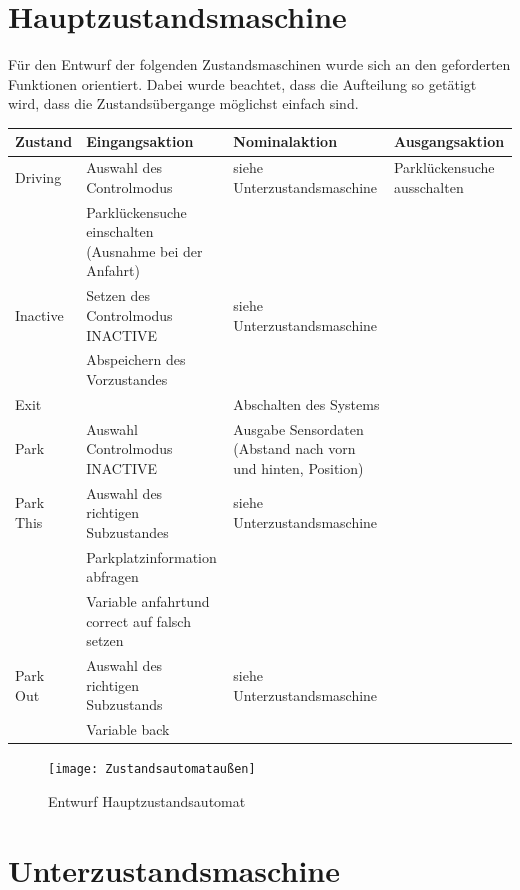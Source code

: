 \section{Hauptzustandsmaschine}

Für den Entwurf der folgenden Zustandsmaschinen wurde sich an den geforderten Funktionen orientiert. Dabei wurde beachtet, dass die Aufteilung so getätigt wird, dass die Zustandsübergange möglichst einfach sind.\\

\noindent \begin{tabular}{|p{1.5cm}|p{4cm}|p{3.8cm}|p{3cm}|}
	\hline 
	Zustand & Eingangsaktion & Nominalaktion & Ausgangsaktion \\ 
	\hline 
	Driving & Auswahl des Controlmodus & siehe Unterzustandsmaschine & Parklückensuche ausschalten \\ 
	\hline 
	 & Parklückensuche einschalten (Ausnahme bei der Anfahrt) &  &  \\ 
	\hline
	Inactive & Setzen des Controlmodus \glqq INACTIVE\grqq{} & siehe Unterzustandsmaschine &  \\ 
	\hline 
	& Abspeichern des Vorzustandes & &  \\ 
	\hline 
	Exit &  & Abschalten des Systems &  \\ 
	\hline
	Park & Auswahl Controlmodus \glqq INACTIVE\grqq & Ausgabe Sensordaten (Abstand nach vorn und hinten, Position) &  \\ 
	\hline
	Park This & Auswahl des richtigen Subzustandes & siehe Unterzustandsmaschine &  \\ 
	\hline
	 & Parkplatzinformation abfragen &  &  \\ 
	\hline
	 & Variable \glqq anfahrt\grqq und \glqq correct\grqq{} auf falsch setzen &  &  \\
	\hline
	Park Out & Auswahl des richtigen Subzustands & siehe Unterzustandsmaschine &  \\ 
	\hline 
	 & 	Variable \glqq back\grqq & & \\
	\hline
\end{tabular} 

\begin{figure}[h]
	\centering
	\texttt{[image: Zustandsautomataußen]}
	\caption{Entwurf Hauptzustandsautomat}
	\label{img:grafik-Hauptzustandsautomat}
\end{figure}

\section{Unterzustandsmaschine}

